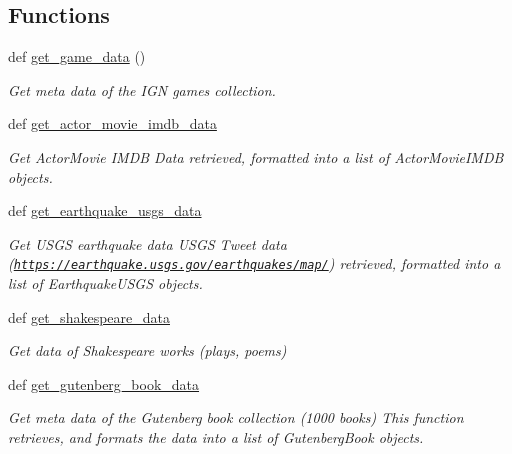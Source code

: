 \subsection*{Functions}
\begin{DoxyCompactItemize}
\item 
def \hyperlink{namespace_bridges_1_1data__src__dependent_1_1data__source_a73a410e03e49b7b13e290490ef5087ab}{get\+\_\+game\+\_\+data} ()
\begin{DoxyCompactList}\small\item\em Get meta data of the I\+G\+N games collection. \end{DoxyCompactList}\item 
def \hyperlink{namespace_bridges_1_1data__src__dependent_1_1data__source_a3b6caaad858f1cb5504f54692faae3d0}{get\+\_\+actor\+\_\+movie\+\_\+imdb\+\_\+data}
\begin{DoxyCompactList}\small\item\em Get Actor\+Movie I\+M\+D\+B Data retrieved, formatted into a list of Actor\+Movie\+I\+M\+D\+B objects. \end{DoxyCompactList}\item 
def \hyperlink{namespace_bridges_1_1data__src__dependent_1_1data__source_a7b4a0d9de0d66540a5cc1314d1cf6954}{get\+\_\+earthquake\+\_\+usgs\+\_\+data}
\begin{DoxyCompactList}\small\item\em Get U\+S\+G\+S earthquake data U\+S\+G\+S Tweet data (\href{https://earthquake.usgs.gov/earthquakes/map/}{\tt https\+://earthquake.\+usgs.\+gov/earthquakes/map/}) retrieved, formatted into a list of Earthquake\+U\+S\+G\+S objects. \end{DoxyCompactList}\item 
def \hyperlink{namespace_bridges_1_1data__src__dependent_1_1data__source_ae6b054796369c6c56e5bf30f95e52a25}{get\+\_\+shakespeare\+\_\+data}
\begin{DoxyCompactList}\small\item\em Get data of Shakespeare works (plays, poems) \end{DoxyCompactList}\item 
def \hyperlink{namespace_bridges_1_1data__src__dependent_1_1data__source_a64912135d5a5d967864a0d7bc8e58652}{get\+\_\+gutenberg\+\_\+book\+\_\+data}
\begin{DoxyCompactList}\small\item\em Get meta data of the Gutenberg book collection (1000 books) This function retrieves, and formats the data into a list of Gutenberg\+Book objects. \end{DoxyCompactList}\item 

\end{DoxyCompactItemize}
